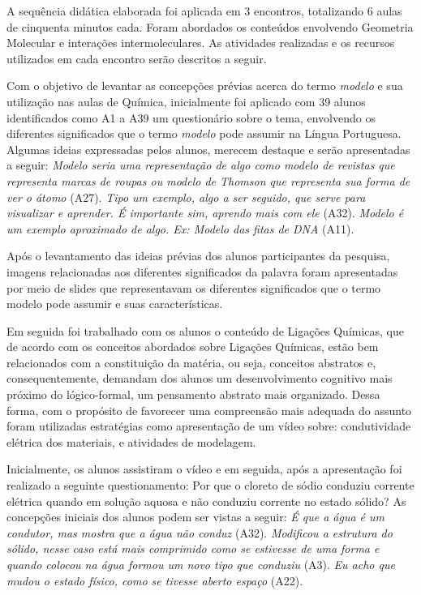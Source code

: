 \begin{refsection}
    A sequência didática elaborada foi aplicada em 3 encontros, totalizando 6 aulas de cinquenta minutos cada. Foram abordados os conteúdos envolvendo Geometria Molecular e interações intermoleculares. As atividades realizadas e os recursos utilizados em cada encontro serão descritos a seguir. 

    Com o objetivo de levantar as concepções prévias acerca do termo \textit{modelo} e sua utilização nas aulas de Química, inicialmente foi aplicado com 39 alunos identificados como A1 a A39 um questionário sobre o tema, envolvendo os diferentes significados que o termo \textit{modelo} pode assumir na Língua Portuguesa. Algumas ideias expressadas pelos alunos, merecem destaque e serão apresentadas a seguir: \textit{Modelo seria uma representação de algo como modelo de revistas que representa marcas de roupas ou modelo de Thomson que representa sua forma de ver o átomo} (A27). \textit{Tipo um exemplo, algo a ser seguido, que serve para visualizar e aprender. É importante sim, aprendo mais com ele} (A32). \textit{Modelo é um exemplo aproximado de algo. Ex: Modelo das fitas de DNA} (A11).  

    Após o levantamento das ideias prévias dos alunos participantes da pesquisa, imagens relacionadas aos diferentes significados da palavra foram apresentadas por meio de slides que representavam os diferentes significados que o termo modelo pode assumir e suas características. 

    Em seguida foi trabalhado com os alunos o conteúdo de Ligações Químicas, que de acordo com \textcite{FERNANDEZAndMARCONDES2006Concepções} os conceitos abordados sobre Ligações Químicas, estão bem relacionados com a constituição da matéria, ou seja, conceitos abstratos e, consequentemente, demandam dos alunos um desenvolvimento cognitivo mais próximo do lógico-formal, um pensamento abstrato mais organizado. Dessa forma, com o propósito de favorecer uma compreensão mais adequada do assunto foram utilizadas estratégias como apresentação de um vídeo sobre: condutividade elétrica dos materiais, e atividades de modelagem.  

    Inicialmente, os alunos assistiram o vídeo e em seguida, após a apresentação foi realizado a seguinte questionamento: Por que o cloreto de sódio conduziu corrente elétrica quando em solução aquosa e não conduziu corrente no estado sólido? As concepções iniciais dos alunos podem ser vistas a seguir: \textit{É que a água é um condutor, mas mostra que a água não conduz} (A32). \textit{Modificou a estrutura do sólido, nesse caso está mais comprimido como se estivesse de uma forma e quando colocou na água formou um novo tipo que conduziu} (A3). \textit{Eu acho que mudou o estado físico, como se tivesse aberto espaço} (A22).


\end{refsection}
